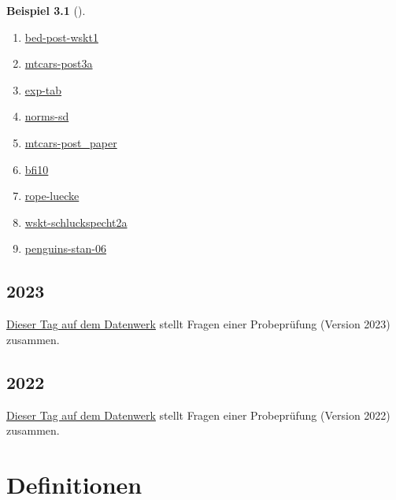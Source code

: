 \documentclass[
  ngerman,
  letterpaper,
  twoside,
  open=any]{scrbook}
\theoremstyle{definition}
\newtheorem{example}{Beispiel}[chapter]
\theoremstyle{plain}
\theoremstyle{definition}
\theoremstyle{definition}
\theoremstyle{remark}
\begin{document}
\begin{example}[]
\begin{enumerate}
  \href{https://datenwerk.netlify.app/posts/klausur-raten/klausur-raten}{klausur-raten}
\item
  \href{https://datenwerk.netlify.app/posts/bed-post-wskt1/bed-post-wskt1}{bed-post-wskt1}
\item
  \href{https://datenwerk.netlify.app/posts/mtcars-post3a/}{mtcars-post3a}
\item
  \href{https://datenwerk.netlify.app/posts/exp-tab/}{exp-tab}
\item
  \href{https://datenwerk.netlify.app/posts/norms-sd/}{norms-sd}
\item
  \href{https://datenwerk.netlify.app/posts/mtcars-post_paper/}{mtcars-post\_paper}
\item
  \href{https://datenwerk.netlify.app/posts/bfi10/}{bfi10}
\item
  \href{https://datenwerk.netlify.app/posts/rope-luecke/}{rope-luecke}
\item
  \href{https://datenwerk.netlify.app/posts/wskt-schluckspecht2a/}{wskt-schluckspecht2a}
\item
  \href{https://datenwerk.netlify.app/posts/penguins-stan-06/index.html}{penguins-stan-06}
\end{enumerate}

\section{2023}\label{section-18}

\href{https://datenwerk.netlify.app/\#category=qm2-pruefung}{Dieser Tag
auf dem Datenwerk} stellt Fragen einer Probeprüfung (Version 2023)
zusammen.

\section{2022}\label{section-19}

\href{https://datenwerk.netlify.app/\#category=exam-22}{Dieser Tag auf
dem Datenwerk} stellt Fragen einer Probeprüfung (Version 2022) zusammen.

\chapter{Definitionen}\label{definitionen}


\end{example}
\end{document}

